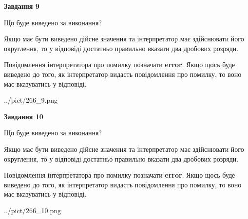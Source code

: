 \documentclass[12pt, ukrainian]{article}
\begin{document}
{\begin {Large}
{\begin {center}\textbf{Завдання 9}\end {center}}\par
Що буде виведено за виконання? \par

Якщо має бути виведено дійсне значення та інтерпретатор має здійснювати його округлення, 
то у відповіді достатньо правильно вказати два дробових розряди.

Повідомлення інтерпретатора про помилку позначати \textbf{error}.
Якщо щось буде виведено до того, як інтерпретатор видасть повідомлення про помилку, 
то воно має вказуватись у відповіді. \par

\begin{center}
	{../pict/266_9.png}
\end{center}
\newpage

{\begin {center}\textbf{Завдання 10}\end {center}}\par
Що буде виведено за виконання? \par

Якщо має бути виведено дійсне значення та інтерпретатор має здійснювати його округлення, 
то у відповіді достатньо правильно вказати два дробових розряди.

Повідомлення інтерпретатора про помилку позначати \textbf{error}.
Якщо щось буде виведено до того, як інтерпретатор видасть повідомлення про помилку, 
то воно має вказуватись у відповіді. \par

\begin{center}
	{../pict/266_10.png}
\end{center}
\newpage

\end {Large}}
\end{document}
